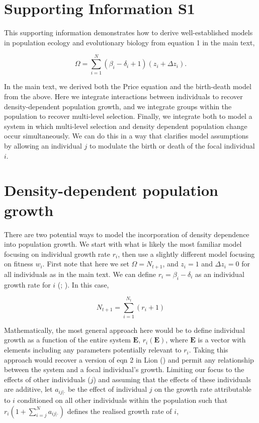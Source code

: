 \documentclass[
]{article}
\begin{document}
\clearpage

\section{Supporting Information S1}\label{supporting-information-s1}

This supporting information demonstrates how to derive well-established
models in population ecology and evolutionary biology from equation 1 in
the main text,

\[\Omega = \sum_{i=1}^{N} \left(\beta_{i} - \delta_{i} + 1 \right)\left(z_{i} + \Delta z_{i} \right).
\tag{1}
\]

In the main text, we derived both the Price equation and the birth-death
model from the above. Here we integrate interactions between individuals
to recover density-dependent population growth, and we integrate groups
within the population to recover multi-level selection. Finally, we
integrate both to model a system in which multi-level selection and
density dependent population change occur simultaneously. We can do this
in a way that clarifies model assumptions by allowing an individual
\(j\) to modulate the birth or death of the focal individual \(i\).

\section{Density-dependent population
growth}\label{density-dependent-population-growth}

There are two potential ways to model the incorporation of density
dependence into population growth. We start with what is likely the most
familiar model focusing on individual growth rate \(r_{i}\), then use a
slightly different model focusing on fitness \(w_{i}\). First note that
here we set \(\Omega = N_{t+1}\), and \(z_{i} = 1\) and
\(\Delta z_{i} = 0\) for all individuals as in the main text. We can
define \(r_{i} = \beta_{i} - \delta_{i}\) as an individual growth rate
for \(i\) (;
). In this case,

\[N_{t+1} = \sum_{i=1}^{N_{t}}\left(r_{i} + 1\right)
\tag{S1}
\]

Mathematically, the most general approach here would be to define
individual growth as a function of the entire system \(\mathbf{E}\),
\(r_{i}(\mathbf{E})\), where \(\mathbf{E}\) is a vector with elements
including any parameters potentially relevant to \(r_{i}\). Taking this
approach would recover a version of eqn 2 in Lion
() and permit any relationship between the
system and a focal individual's growth. Limiting our focus to the
effects of other individuals (\(j\)) and assuming that the effects of
these individuals are additive, let \(a_{ij|\cdot}\) be the effect of
individual \(j\) on the growth rate attributable to \(i\) conditioned on
all other individuals within the population such that
\(r_{i}\left(1 + \sum_{i = j}^{N}a_{ij|\cdot} \right)\) defines the
realised growth rate of \(i\),
\end{document}
